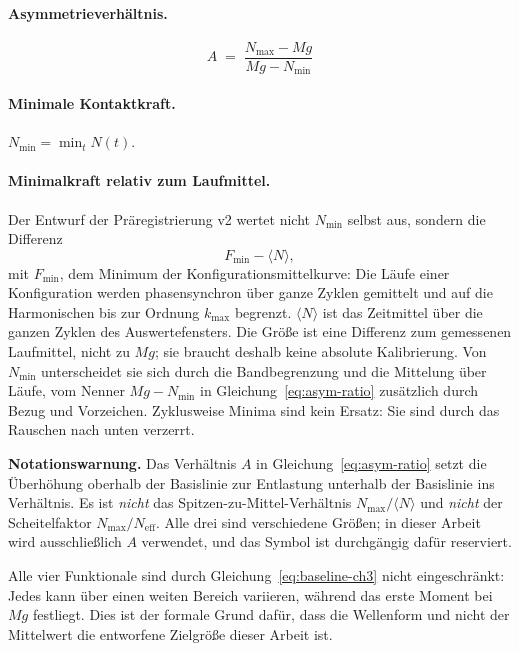 \documentclass[12pt,a4paper]{report}
\begin{document}
\paragraph{Asymmetrieverhältnis.}
\begin{equation}
  A \;=\; \frac{N_{\max} - Mg}{Mg - N_{\min}}
  \label{eq:asym-ratio}
\end{equation}

\paragraph{Minimale Kontaktkraft.} $N_{\min} = \min_{t} N(t)$.

\paragraph{Minimalkraft relativ zum Laufmittel.} Der Entwurf der
Präregistrierung v2 wertet nicht $N_{\min}$ selbst aus, sondern die
Differenz
\[
  F_{\min} - \langle N \rangle ,
\]
mit $F_{\min}$, dem Minimum der Konfigurationsmittelkurve: Die Läufe einer
Konfiguration werden phasensynchron über ganze Zyklen gemittelt und auf
die Harmonischen bis zur Ordnung $k_{\max}$ begrenzt. $\langle N\rangle$
ist das Zeitmittel über die ganzen Zyklen des Auswertefensters. Die Größe
ist eine Differenz zum gemessenen Laufmittel, nicht zu $Mg$; sie braucht
deshalb keine absolute Kalibrierung. Von $N_{\min}$ unterscheidet sie
sich durch die Bandbegrenzung und die Mittelung über Läufe, vom Nenner
$Mg - N_{\min}$ in Gleichung~\eqref{eq:asym-ratio} zusätzlich durch Bezug
und Vorzeichen. Zyklusweise Minima sind kein Ersatz: Sie sind durch das
Rauschen nach unten verzerrt.

\medskip
\noindent
\textbf{Notationswarnung.} Das Verhältnis $A$ in
Gleichung~\eqref{eq:asym-ratio} setzt die Überhöhung oberhalb der
Basislinie zur Entlastung unterhalb der Basislinie ins Verhältnis. Es ist
\emph{nicht} das Spitzen-zu-Mittel-Verhältnis
$N_{\max}/\langle N \rangle$ und \emph{nicht} der Scheitelfaktor
$N_{\max}/N_{\mathrm{eff}}$. Alle drei sind verschiedene Größen; in
dieser Arbeit wird ausschließlich $A$ verwendet, und das Symbol ist
durchgängig dafür reserviert.

\medskip
\noindent
Alle vier Funktionale sind durch Gleichung~\eqref{eq:baseline-ch3} nicht
eingeschränkt: Jedes kann über einen weiten Bereich variieren, während
das erste Moment bei $Mg$ festliegt. Dies ist der formale Grund dafür,
dass die Wellenform und nicht der Mittelwert die entworfene Zielgröße
dieser Arbeit ist.
\end{document}

